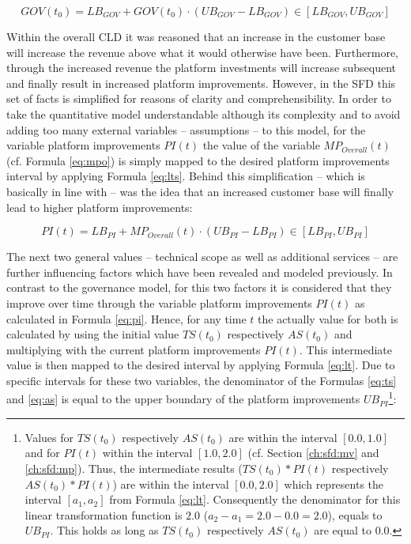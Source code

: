 \begin{equation}\label{eq:gov}
	GOV(t_0) = LB_{GOV} + GOV(t_0) \cdot (UB_{GOV} - LB_{GOV}) \in [LB_{GOV},UB_{GOV}]
\end{equation}

Within the overall \ac{CLD} it was reasoned that an increase in the customer base will increase the revenue above what it would otherwise have been. Furthermore, through the increased revenue the platform investments will increase subsequent and finally result in increased platform improvements. However, in the \ac{SFD} this set of facts is simplified for reasons of clarity and comprehensibility. In order to take the quantitative model understandable although its complexity and to avoid adding too many external variables -- assumptions -- to this model, for the variable  platform improvements $PI(t)$ the value of the variable $MP_{Overall}(t)$ (cf. Formula \ref{eq:mpo}) is simply mapped to the desired platform improvements interval by applying Formula \ref{eq:lts}. Behind this simplification -- which is basically in line with \citet[p. 200]{Evans2003} -- was the idea that an increased customer base will finally lead to higher platform improvements:

\begin{equation}\label{eq:pi}
	PI(t) = LB_{PI} + MP_{Overall}(t) \cdot (UB_{PI} - LB_{PI}) \in [LB_{PI},UB_{PI}]
\end{equation}

The next two general values -- technical scope as well as additional services -- are further influencing factors which have been revealed and modeled previously. In contrast to the governance model, for this two factors it is considered that they improve over time through the variable platform improvements $PI(t)$ as calculated in Formula \ref{eq:pi}. Hence, for any time $t$ the actually value for both is calculated by using the initial value $TS(t_0)$ respectively $ AS(t_0)$ and multiplying with the current platform improvements $PI(t)$. This intermediate value is then mapped to the desired interval by applying Formula \ref{eq:lt}. Due to specific intervals for these two variables, the denominator of the Formulas \ref{eq:ts} and \ref{eq:as} is equal to the upper boundary of the platform improvements $UB_{PI}$\footnote{Values for $TS(t_0)$ respectively $AS(t_0)$ are within the interval $[0.0,1.0]$ and for $PI(t)$ within the interval $[1.0,2.0]$ (cf. Section \ref{ch:sfd:mv} and \ref{ch:sfd:mp}). Thus, the intermediate results ($TS(t_0)*PI(t)$ respectively $AS(t_0) *PI(t)$) are within the interval $[0.0,2.0]$ which represents the interval $[a_1,a_2]$ from Formula \ref{eq:lt}. Consequently the denominator for this linear transformation function is $2.0$ ($a_2 - a_1 = 2.0 - 0.0 = 2.0$), equals to $UB_{PI}$. This holds as long as $TS(t_0)$ respectively $AS(t_0)$ are equal to $0.0$.}:

